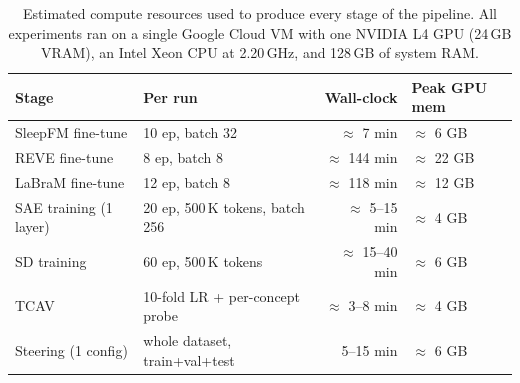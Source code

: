 \documentclass{article}
\begin{document}
\begin{table}[h]                                                                                                                                     
  \centering                                             
  \small
  \caption{Estimated compute resources used to produce every stage of the pipeline.
  All experiments ran on a single Google Cloud VM with one NVIDIA L4 GPU                                                                               
  (24\,GB VRAM), an Intel Xeon CPU at 2.20\,GHz, and 128\,GB of system RAM.     }                                                                                                                    
  \label{tab:compute}                                    
  \begin{tabular}{l l r l}                                                                                                                             
  \toprule                                                                                                                                             
  \textbf{Stage} & \textbf{Per run} & \textbf{Wall-clock} & \textbf{Peak GPU mem} \\
  \midrule                                                                                                                                             
  SleepFM fine-tune        & 10 ep, batch 32                    & $\approx$ 7 min     & $\approx$ 6 GB \\
  REVE fine-tune           & 8 ep, batch 8                      & $\approx$ 144 min   & $\approx$ 22 GB \\                                             
  LaBraM fine-tune         & 12 ep, batch 8                     & $\approx$ 118 min   & $\approx$ 12 GB \\                                             
  SAE training (1 layer)   & 20 ep, 500\,K tokens, batch 256    & $\approx$ 5--15 min & $\approx$ 4 GB \\                                              
  SD training             & 60 ep, 500\,K tokens  & $\approx$ 15--40 min & $\approx$ 6 GB \\                         
  TCAV & 10-fold LR + per-concept probe     & $\approx$ 3--8 min  & $\approx$ 4 GB \\                                              
  Steering (1 config)       & whole dataset, train+val+test      & 5--15 min           & $\approx$ 6 GB \\                                              
  \bottomrule                                                                                                                                          
  \end{tabular}                                                                                                                                        
  \end{table}  


\newpage

\end{document}
